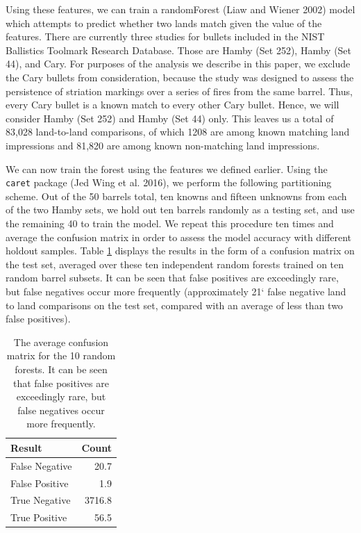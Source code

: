 \documentclass[12pt,]{article}
\theoremstyle{definition}
\theoremstyle{definition}
\theoremstyle{definition}
\theoremstyle{remark}
\begin{document}
Using these features, we can train a randomForest (Liaw and Wiener 2002)
model which attempts to predict whether two lands match given the value
of the features. There are currently three studies for bullets included
in the NIST Ballistics Toolmark Research Database. Those are Hamby (Set
252), Hamby (Set 44), and Cary. For purposes of the analysis we describe
in this paper, we exclude the Cary bullets from consideration, because
the study was designed to assess the persistence of striation markings
over a series of fires from the same barrel. Thus, every Cary bullet is
a known match to every other Cary bullet. Hence, we will consider Hamby
(Set 252) and Hamby (Set 44) only. This leaves us a total of 83,028
land-to-land comparisons, of which 1208 are among known matching land
impressions and 81,820 are among known non-matching land impressions.

We can now train the forest using the features we defined earlier. Using
the \texttt{caret} package (Jed Wing et al. 2016), we perform the
following partitioning scheme. Out of the 50 barrels total, ten knowns
and fifteen unknowns from each of the two Hamby sets, we hold out ten
barrels randomly as a testing set, and use the remaining 40 to train the
model. We repeat this procedure ten times and average the confusion
matrix in order to assess the model accuracy with different holdout
samples. Table \ref{tab:avgforest} displays the results in the form of a
confusion matrix on the test set, averaged over these ten independent
random forests trained on ten random barrel subsets. It can be seen that
false positives are exceedingly rare, but false negatives occur more
frequently (approximately 21` false negative land to land comparisons on
the test set, compared with an average of less than two false
positives).

\begin{table}[H]
\centering
\begin{tabular}{lr}
  \hline
Result & Count \\ 
  \hline
False Negative & 20.7 \\ 
  False Positive & 1.9 \\ 
  True Negative & 3716.8 \\ 
  True Positive & 56.5 \\ 
   \hline
\end{tabular}
\caption{The average confusion matrix for the 10 random forests. It can be seen that false positives are exceedingly rare, but false negatives occur more frequently.} 
\label{tab:avgforest}
\end{table}
\end{document}

